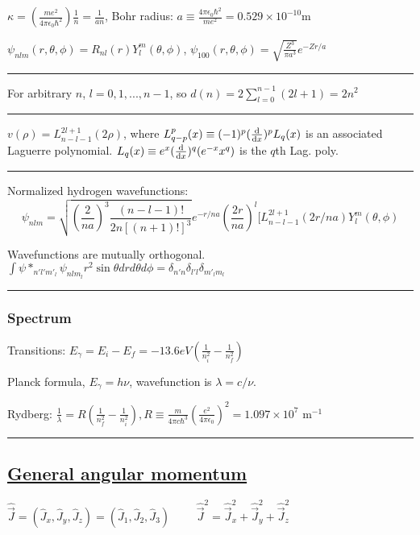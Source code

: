 $\kappa = (\frac{me^2}{4 \pi \epsilon_0 \hbar^2}) \frac{1}{n} = \frac{1}{an}$, Bohr radius: $a \equiv \frac{4 \pi \epsilon_0 \hbar^2}{me^2} = 0.529 \times 10^{-10} \textrm{m}$

$\psi_{nlm}(r, \theta, \phi) = R_{nl}(r) Y_l^m(\theta, \phi)$, 
$\psi_{100}(r, \theta, \phi) = \sqrt{\frac{Z^3}{\pi a^3}} e^{-Zr/a}$

\hrule height 0.1pt

For arbitrary $n$, $l = 0, 1, ..., n-1$, so $d(n) = 2 \sum_{l=0}^{n-1} (2l+1) = 2 n^2$

\hrule height 0.07pt

$v(\rho) = L_{n-l-1}^{2l+1} (2 \rho)$, where $L_{q-p}^p(x) \equiv (-1)^p (\dv{}{x})^p L_q (x)$ is an associated Laguerre polynomial. $L_q(x) \equiv e^x (\dv{}{x})^q (e^{-x} x^q)$ is the $q$th Lag. poly.

\hrule height 0.07pt

Normalized hydrogen wavefunctions:
$$\psi_{nlm} = \sqrt{(\frac{2}{na})^3 \frac{(n-l-1)!}{2n[(n+1)!]^3}} e^{-r/na} (\frac{2r}{na})^l [L_{n-l-1}^{2l+1} (2r/na) Y_l^m (\theta, \phi)$$

Wavefunctions are mutually orthogonal.
$\int \psi*_{n'l'm'_l} \psi_{nlm_l} r^2 \sin \theta dr d\theta d \phi = \delta_{n'n} \delta_{l'l} \delta_{m'_l m_l}$

\hrule height 0.1pt

\subsubsection{Spectrum}

Transitions: $E_{\gamma} = E_i - E_f = -13.6 eV(\frac{1}{n_i^2} - \frac{1}{n_f^2})$

\vspace{-2pt}

Planck formula, $E_{\gamma} = h \nu$, wavefunction is $\lambda = c / \nu$. 

Rydberg: $\frac{1}{\lambda} = R(\frac{1}{n^2_f} - \frac{1}{n^2_i}), R \equiv \frac{m}{4 \pi c \hbar^3} (\frac{e^2}{4 \pi \epsilon_0})^2 = 1.097 \times 10^7 \textrm{ m}^{-1}$

\hrule height 0.1pt

\subsection{\underline{General angular momentum}}
$\widehat{\vec{J}} = (\widehat{J}_x, \widehat{J}_y, \widehat{J}_z) = (\widehat{J}_1, \widehat{J}_2, \widehat{J}_3) \qquad$ 
$\widehat{\vec{J}}^2 = \widehat{\vec{J}}^2_x + \widehat{\vec{J}}^2_y + \widehat{\vec{J}}^2_z$

